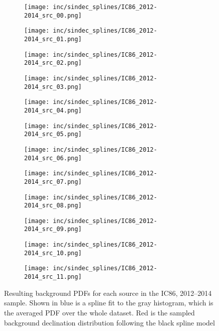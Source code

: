 \begin{figure}[h] %
  \centering
  \begin{subfigure}[c]{0.24\textwidth}
    \texttt{[image: inc/sindec\_splines/IC86\_2012-2014\_src\_00.png]}
  \end{subfigure}
  \hfill
  \begin{subfigure}[c]{0.24\textwidth}
    \texttt{[image: inc/sindec\_splines/IC86\_2012-2014\_src\_01.png]}
  \end{subfigure}
  \hfill
  \begin{subfigure}[c]{0.24\textwidth}
    \texttt{[image: inc/sindec\_splines/IC86\_2012-2014\_src\_02.png]}
  \end{subfigure}
  \hfill
  \begin{subfigure}[c]{0.24\textwidth}
    \texttt{[image: inc/sindec\_splines/IC86\_2012-2014\_src\_03.png]}
  \end{subfigure}

  \begin{subfigure}[c]{0.24\textwidth}
    \texttt{[image: inc/sindec\_splines/IC86\_2012-2014\_src\_04.png]}
  \end{subfigure}
  \hfill
  \begin{subfigure}[c]{0.24\textwidth}
    \texttt{[image: inc/sindec\_splines/IC86\_2012-2014\_src\_05.png]}
  \end{subfigure}
  \hfill
  \begin{subfigure}[c]{0.24\textwidth}
    \texttt{[image: inc/sindec\_splines/IC86\_2012-2014\_src\_06.png]}
  \end{subfigure}
  \hfill
  \begin{subfigure}[c]{0.24\textwidth}
    \texttt{[image: inc/sindec\_splines/IC86\_2012-2014\_src\_07.png]}
  \end{subfigure}

  \begin{subfigure}[c]{0.24\textwidth}
    \texttt{[image: inc/sindec\_splines/IC86\_2012-2014\_src\_08.png]}
  \end{subfigure}
  \hfill
  \begin{subfigure}[c]{0.24\textwidth}
    \texttt{[image: inc/sindec\_splines/IC86\_2012-2014\_src\_09.png]}
  \end{subfigure}
  \hfill
  \begin{subfigure}[c]{0.24\textwidth}
    \texttt{[image: inc/sindec\_splines/IC86\_2012-2014\_src\_10.png]}
  \end{subfigure}
  \hfill
  \begin{subfigure}[c]{0.24\textwidth}
    \texttt{[image: inc/sindec\_splines/IC86\_2012-2014\_src\_11.png]}
  \end{subfigure}

  \caption{Resulting background PDFs for each source in the IC86, 2012--2014 sample. Shown in blue is a spline fit to the gray histogram, which is the averaged PDF over the whole dataset. Red is the sampled background declination distribution following the black spline model}
  \label{fig:model_bg_pdfs}
\end{figure}


